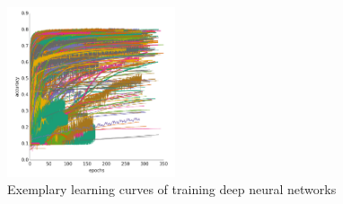 
\begin{frame}{}

\begin{figure}
   \centering
   \includegraphics[width=0.44\textwidth]{../w07_hpo_speedup/images/learningcurve/learning_curve_domhan.png}
   \caption{Exemplary learning curves of training deep neural networks}
\end{figure}
\end{frame}

